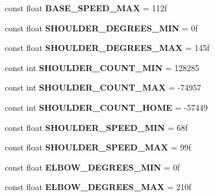 \begin{DoxyCompactItemize}
const float {\bfseries B\+A\+S\+E\+\_\+\+S\+P\+E\+E\+D\+\_\+\+M\+AX} = 112f
\item 
\mbox{\label{class_scorbot_e_r_v_plus_a36c42bc4fa0138dd783133c66fe44f06}} 
const float {\bfseries S\+H\+O\+U\+L\+D\+E\+R\+\_\+\+D\+E\+G\+R\+E\+E\+S\+\_\+\+M\+IN} = 0f
\item 
\mbox{\label{class_scorbot_e_r_v_plus_a73d4d1e3f2e76c2cab6d36f8daef78b8}} 
const float {\bfseries S\+H\+O\+U\+L\+D\+E\+R\+\_\+\+D\+E\+G\+R\+E\+E\+S\+\_\+\+M\+AX} = 145f
\item 
\mbox{\label{class_scorbot_e_r_v_plus_a4d0249ecba099244b4f4ed7efa59665d}} 
const int {\bfseries S\+H\+O\+U\+L\+D\+E\+R\+\_\+\+C\+O\+U\+N\+T\+\_\+\+M\+IN} = 128285
\item 
\mbox{\label{class_scorbot_e_r_v_plus_a5d00b0b6d76e7c424f4ca94e098595e2}} 
const int {\bfseries S\+H\+O\+U\+L\+D\+E\+R\+\_\+\+C\+O\+U\+N\+T\+\_\+\+M\+AX} = -\/74957
\item 
\mbox{\label{class_scorbot_e_r_v_plus_a8b0df0bc290d9070aae27ec17cd5a1a3}} 
const int {\bfseries S\+H\+O\+U\+L\+D\+E\+R\+\_\+\+C\+O\+U\+N\+T\+\_\+\+H\+O\+ME} = -\/57449
\item 
\mbox{\label{class_scorbot_e_r_v_plus_a52042f1e92bdf831a51aff1a05fbf1ca}} 
const float {\bfseries S\+H\+O\+U\+L\+D\+E\+R\+\_\+\+S\+P\+E\+E\+D\+\_\+\+M\+IN} = 68f
\item 
\mbox{\label{class_scorbot_e_r_v_plus_a8df7c024790ab4043a6c1a90529b11ff}} 
const float {\bfseries S\+H\+O\+U\+L\+D\+E\+R\+\_\+\+S\+P\+E\+E\+D\+\_\+\+M\+AX} = 99f
\item 
\mbox{\label{class_scorbot_e_r_v_plus_a7935668a844944f2015a3a07da544bf3}} 
const float {\bfseries E\+L\+B\+O\+W\+\_\+\+D\+E\+G\+R\+E\+E\+S\+\_\+\+M\+IN} = 0f
\item 
\mbox{\label{class_scorbot_e_r_v_plus_a847465214c8486aad93e41ab6c177398}} 
const float {\bfseries E\+L\+B\+O\+W\+\_\+\+D\+E\+G\+R\+E\+E\+S\+\_\+\+M\+AX} = 210f

\end{DoxyCompactItemize}
